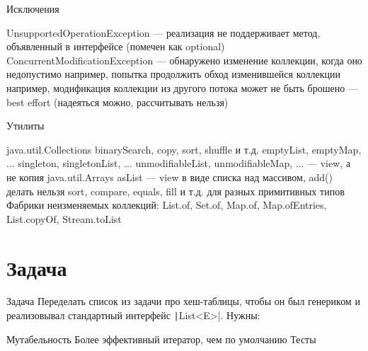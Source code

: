 \documentclass{../../slides-style}
\begin{document}
    \begin{frame}{Исключения}
        \begin{outline}
            \1 UnsupportedOperationException --- реализация не поддерживает метод, объявленный в интерфейсе (помечен как optional)
            \1 ConcurrentModificationException --- обнаружено изменение коллекции, когда оно недопустимо 
                \2 например, попытка продолжить обход изменившейся коллекции
                \2 например, модификация коллекции из другого потока
                \2 может не быть брошено --- best effort (надеяться можно, рассчитывать нельзя)
        \end{outline}
    \end{frame}

    \begin{frame}{Утилиты}
        \begin{outline}
            \1 java.util.Collections
                \2 binarySearch, copy, sort, shuffle и т.д.
                \2 emptyList, emptyMap, ...
                \2 singleton, singletonList, ...
                \2 unmodifiableList, unmodifiableMap, ... --- view, а не копия
            \1 java.util.Arrays
                \2 asList --- view в виде списка над массивом, add() делать нельзя
                \2 sort, compare, equals, fill и т.д. для разных примитивных типов
            \1 Фабрики неизменяемых коллекций: List.of, Set.of, Map.of, Map.ofEntries, List.copyOf, Stream.toList
        \end{outline}
    \end{frame}

    \section{Задача}

    \begin{frame}{Задача}
        Переделать список из задачи про хеш-таблицы, чтобы он был генериком и реализовывал стандартный интерфейс \texttt|List<E>|. Нужны:
        \begin{outline}
            \1 Мутабельность
            \1 Более эффективный итератор, чем по умолчанию
            \1 Тесты
        \end{outline}
    \end{frame}
\end{document}
